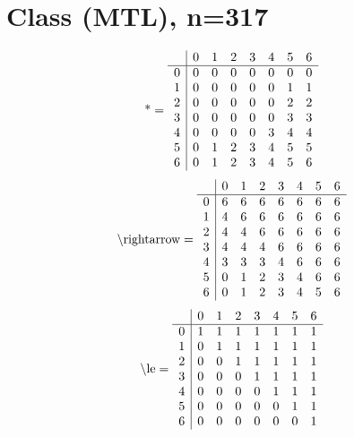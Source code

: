 \documentclass[11pt]{article}
\begin{document}
\section{Class (MTL), n=317}
\[\text{*} = 
\begin{array}{r | r r r r r r r}
 & 0 & 1 & 2 & 3 & 4 & 5 & 6 \\ \hline
0 & 0 & 0 & 0 & 0 & 0 & 0 & 0 \\
1 & 0 & 0 & 0 & 0 & 0 & 1 & 1 \\
2 & 0 & 0 & 0 & 0 & 0 & 2 & 2 \\
3 & 0 & 0 & 0 & 0 & 0 & 3 & 3 \\
4 & 0 & 0 & 0 & 0 & 3 & 4 & 4 \\
5 & 0 & 1 & 2 & 3 & 4 & 5 & 5 \\
6 & 0 & 1 & 2 & 3 & 4 & 5 & 6 \\
\end{array}
\]
\[\text{\textbackslash rightarrow} = 
\begin{array}{r | r r r r r r r}
 & 0 & 1 & 2 & 3 & 4 & 5 & 6 \\ \hline
0 & 6 & 6 & 6 & 6 & 6 & 6 & 6 \\
1 & 4 & 6 & 6 & 6 & 6 & 6 & 6 \\
2 & 4 & 4 & 6 & 6 & 6 & 6 & 6 \\
3 & 4 & 4 & 4 & 6 & 6 & 6 & 6 \\
4 & 3 & 3 & 3 & 4 & 6 & 6 & 6 \\
5 & 0 & 1 & 2 & 3 & 4 & 6 & 6 \\
6 & 0 & 1 & 2 & 3 & 4 & 5 & 6 \\
\end{array}
\]
\[\text{\textbackslash le} = 
\begin{array}{r | r r r r r r r}
 & 0 & 1 & 2 & 3 & 4 & 5 & 6 \\ \hline
0 & 1 & 1 & 1 & 1 & 1 & 1 & 1 \\
1 & 0 & 1 & 1 & 1 & 1 & 1 & 1 \\
2 & 0 & 0 & 1 & 1 & 1 & 1 & 1 \\
3 & 0 & 0 & 0 & 1 & 1 & 1 & 1 \\
4 & 0 & 0 & 0 & 0 & 1 & 1 & 1 \\
5 & 0 & 0 & 0 & 0 & 0 & 1 & 1 \\
6 & 0 & 0 & 0 & 0 & 0 & 0 & 1 \\
\end{array}
\]
\end{document}
